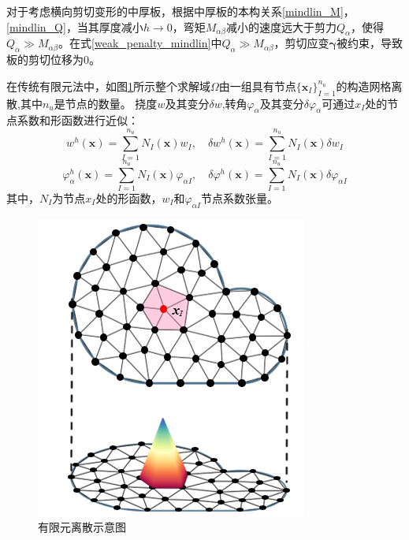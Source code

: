对于考虑横向剪切变形的中厚板，根据中厚板的本构关系\eqref{mindlin_M}，\eqref{mindlin_Q}，当其厚度减小$h\rightarrow 0$，弯矩$M_{\alpha \beta}$减小的速度远大于剪力$Q_{\alpha}$，使得$Q_{\alpha}\gg M_{\alpha \beta}$。在式\eqref{weak_penalty_mindlin}中$Q_{\alpha}\gg M_{\alpha \beta}$，剪切应变$\boldsymbol{\gamma}$被约束，导致板的剪切位移为$0$。

在传统有限元法中，如图\ref{mindlin_fem}所示整个求解域$\Omega$由一组具有节点$\{\boldsymbol x_I\}_{I=1}^{n_u}$的构造网格离散,其中$n_u$是节点的数量。
挠度$w$及其变分$\delta w $,转角$\varphi_\alpha$及其变分$\delta \varphi_\alpha $可通过$x_I$处的节点系数和形函数进行近似：
\begin{equation}\label{w_h}
    w^h(\boldsymbol x) = \sum_{I=1}^{n_u} N_I(\boldsymbol x) w_I, \quad \delta w^h(\boldsymbol x) = \sum_{I=1}^{n_u} N_I(\boldsymbol x) \delta w_I
\end{equation}
\begin{equation}\label{varphi_h}
    \varphi^h_{\alpha}(\boldsymbol x) = \sum_{I=1}^{n_u} N_I(\boldsymbol x) \varphi_{\alpha I}, \quad \delta \varphi^h(\boldsymbol x) = \sum_{I=1}^{n_u} N_I(\boldsymbol x) \delta \varphi_{\alpha I}
\end{equation}
其中，$N_I$为节点$x_I$处的形函数，$w_I$和$\varphi_{\alpha I}$节点系数张量。
\begin{figure}[H]
    \centering 
        \includegraphics[scale=1.5]{figures/fem.png}
        \caption{有限元离散示意图}\label{mindlin_fem}
\end{figure}


